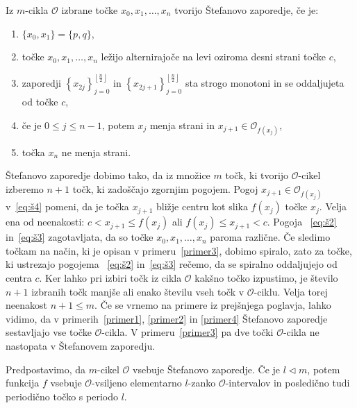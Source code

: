 \documentclass[mat2]{fmfdelo}
\begin{document}
\begin{definicija}\label{def:stef}
Iz $m$-cikla $\mathcal{O}$ izbrane točke $x_0, x_1, \dots, x_n$ tvorijo Štefanovo zaporedje, če je:

\begin{enumerate}[label={(Š\arabic*)}]
    \item $\{x_0, x_1\} = \{p, q\}$, \label{eq:š1}
    \item točke $x_0, x_1, \dots, x_n$ ležijo alternirajoče na levi oziroma desni strani točke $c$, \label{eq:š2}
    \item zaporedji 
    $\left \{ x_{2j} \right \}_{j=0}^{\left \lfloor \frac{n}{2} \right \rfloor}$ 
    in
    $\left \{ x_{2j+1} \right \}_{j=0}^{\left \lfloor \frac{n}{2} \right \rfloor}$ sta strogo monotoni in se oddaljujeta od točke $c$, \label{eq:š3}
    \item če je $0\leq j \leq n-1$, potem $x_j$ menja strani in $x_{j+1} \in \mathcal{O}_{f(x_j)}$,\label{eq:š4}
    \item točka $x_n$ ne menja strani. \label{eq:š5}
\end{enumerate}
  
\end{definicija}
\begin{opomba}\label{op:štefzap}
Štefanovo zaporedje dobimo tako, da iz množice $m$ točk, ki tvorijo $\mathcal{O}$-cikel izberemo $n+1$ točk, ki zadoščajo zgornjim pogojem. 
Pogoj $x_{j+1} \in \mathcal{O}_{f(x_j)}$ v~\ref{eq:š4} pomeni, da je točka $x_{j+1}$ bližje centru kot slika $f(x_j)$ točke $x_j$. Velja ena od neenakosti: $c < x_{j+1} \leq f(x_j)$ ali $f(x_j) \leq x_{j+1} < c$. Pogoja ~\ref{eq:š2} in~\ref{eq:š3} zagotavljata, da so točke $x_0, x_1, \dots, x_n$ paroma različne. Če sledimo točkam na način, ki je opisan v primeru~\ref{primer3}, dobimo spiralo, zato za točke, ki ustrezajo pogojema ~\ref{eq:š2} in~\ref{eq:š3} rečemo, da se spiralno oddaljujejo od centra $c$. Ker lahko pri izbiri točk iz cikla $\mathcal{O}$ kakšno točko izpustimo, je število $n+1$ izbranih točk manjše ali enako številu vseh točk v $\mathcal{O}$-ciklu. Velja torej neenakost $n+1 \leq m$. Če se vrnemo na primere iz prejšnjega poglavja, lahko vidimo, da v primerih~\ref{primer1}, \ref{primer2} in \ref{primer4} Štefanovo zaporedje sestavljajo vse točke $\mathcal{O}$-cikla. V primeru~\ref{primer3} pa dve točki $\mathcal{O}$-cikla ne nastopata v Štefanovem zaporedju.
\end{opomba}

\begin{trditev}\label{trd:zap-cikel}
Predpostavimo, da $m$-cikel $\mathcal{O}$ vsebuje Štefanovo zaporedje. Če je $l \triangleleft m$, potem funkcija $f$ vsebuje $\mathcal{O}$-vsiljeno elementarno $l$-zanko $\mathcal{O}$-intervalov in posledično tudi periodično točko s periodo $l$.
\end{trditev}
\end{document}
